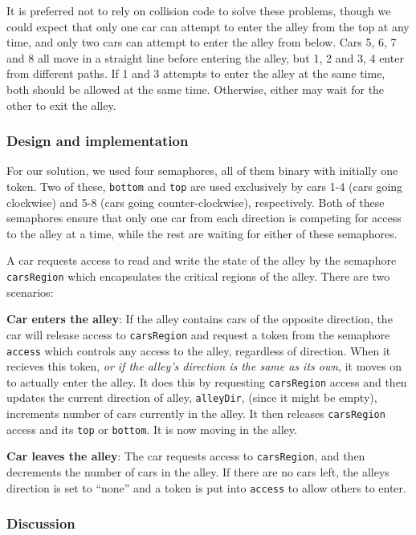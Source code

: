 It is preferred not to rely on collision code to solve these problems, though we could expect that only one car can attempt to enter the alley from the top at any time, and only two cars can attempt to enter the alley from below. Cars 5, 6, 7 and 8 all move in a straight line before entering the alley, but 1, 2 and 3, 4 enter from different paths. If 1 and 3 attempts to enter the alley at the same time, both should be allowed at the same time. Otherwise, either may wait for the other to exit the alley.

\subsubsection*{Design and implementation}
For our solution, we used four semaphores, all of them binary with initially one token. Two of these, \texttt{bottom} and \texttt{top} are used exclusively by cars 1-4 (cars going clockwise) and 5-8 (cars going counter-clockwise), respectively. Both of these semaphores ensure that only one car from each direction is competing for access to the alley at a time, while the rest are waiting for either of these semaphores.

A car requests access to read and write the state of the alley by the semaphore \texttt{carsRegion} which encapsulates the critical regions of the alley. There are two scenarios:

\textbf{Car enters the alley}: If the alley contains cars of the opposite direction, the car will release access to \texttt{carsRegion} and request a token from the semaphore \texttt{access} which controls any access to the alley, regardless of direction. When it recieves this token, \emph{or if the alley's direction is the same as its own}, it moves on to actually enter the alley. It does this by requesting \texttt{carsRegion} access and then updates the current direction of alley, \texttt{alleyDir}, (since it might be empty), increments number of cars currently in the alley. It then releases \texttt{carsRegion} access and its \texttt{top} or \texttt{bottom}. It is now moving in the alley.

\textbf{Car leaves the alley}: The car requests access to \texttt{carsRegion}, and then decrements the number of cars in the alley. If there are no cars left, the alleys direction is set to ``none'' and a token is put into \texttt{access} to allow others to enter.

\subsubsection*{Discussion}

